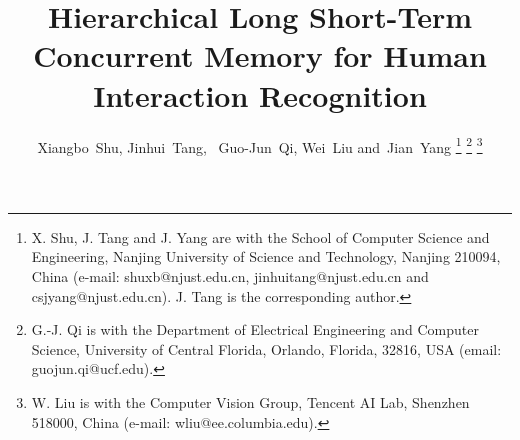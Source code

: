 \documentclass[9pt,journal,letterpaper,twocolumn]{IEEEtran}
\begin{document}
	
	\title{Hierarchical Long Short-Term Concurrent Memory for Human Interaction Recognition}
	
	


	\author{Xiangbo~Shu,
		Jinhui~Tang,~
		Guo-Jun~Qi, Wei~Liu
		and~Jian~Yang
\thanks{X. Shu, J. Tang and J. Yang are with the School of Computer Science and Engineering, Nanjing
			University of Science and Technology, Nanjing 210094, China (e-mail: shuxb@njust.edu.cn, jinhuitang@njust.edu.cn and csjyang@njust.edu.cn). J. Tang is the corresponding author.}
		\thanks{G.-J. Qi is with the Department of Electrical Engineering and Computer Science, University of Central Florida, Orlando, Florida, 32816, USA (email: guojun.qi@ucf.edu).}
		\thanks{W. Liu is  with  the  Computer  Vision  Group,  Tencent  AI  Lab,  Shenzhen
			518000, China (e-mail: wliu@ee.columbia.edu).}}
	


	
	


	
	


	
	


	
	
\end{document}
